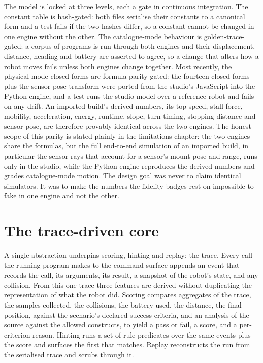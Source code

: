 \documentclass[11pt,a4paper]{report}
\begin{document}
The model is locked at three levels, each a gate in continuous integration. The constant table is hash-gated: both files serialise their constants to a canonical form and a test fails if the two hashes differ, so a constant cannot be changed in one engine without the other. The catalogue-mode behaviour is golden-trace-gated: a corpus of programs is run through both engines and their displacement, distance, heading and battery are asserted to agree, so a change that alters how a robot moves fails unless both engines change together. Most recently, the physical-mode closed forms are formula-parity-gated: the fourteen closed forms plus the sensor-pose transform were ported from the studio's JavaScript into the Python engine, and a test runs the studio model over a reference robot and fails on any drift. An imported build's derived numbers, its top speed, stall force, mobility, acceleration, energy, runtime, slope, turn timing, stopping distance and sensor pose, are therefore provably identical across the two engines. The honest scope of this parity is stated plainly in the limitations chapter: the two engines share the formulas, but the full end-to-end simulation of an imported build, in particular the sensor rays that account for a sensor's mount pose and range, runs only in the studio, while the Python engine reproduces the derived numbers and grades catalogue-mode motion. The design goal was never to claim identical simulators. It was to make the numbers the fidelity badges rest on impossible to fake in one engine and not the other.

\section{The trace-driven core}
A single abstraction underpins scoring, hinting and replay: the trace. Every call the running program makes to the command surface appends an event that records the call, its arguments, its result, a snapshot of the robot's state, and any collision. From this one trace three features are derived without duplicating the representation of what the robot did. Scoring compares aggregates of the trace, the samples collected, the collisions, the battery used, the distance, the final position, against the scenario's declared success criteria, and an analysis of the source against the allowed constructs, to yield a pass or fail, a score, and a per-criterion reason. Hinting runs a set of rule predicates over the same events plus the score and surfaces the first that matches. Replay reconstructs the run from the serialised trace and scrubs through it.
\end{document}
